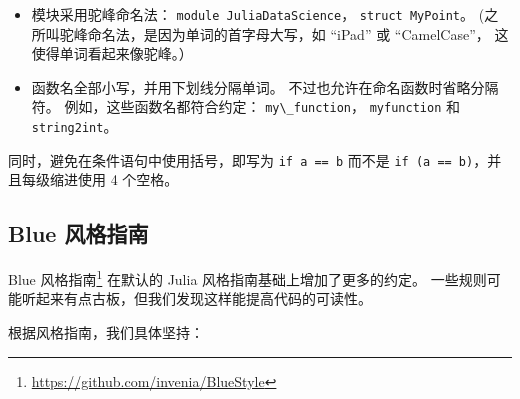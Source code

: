 \documentclass[
  notoc %
]{tufte-book}
\DeclareRobustCommand{\href}[2]{#2\footnote{\url{#1}}}
\providecommand{\tightlist}{%
  \setlength{\itemsep}{0pt}\setlength{\parskip}{0pt}
}
\newcommand{\passthrough}[1]{#1}
\begin{document}
\begin{itemize}
\tightlist
\item
  模块采用驼峰命名法：
  \passthrough{\lstinline!module JuliaDataScience!}，
  \passthrough{\lstinline!struct MyPoint!}。
  (之所叫驼峰命名法，是因为单词的首字母大写，如 ``iPad'' 或
  ``CamelCase''， 这使得单词看起来像驼峰。）
\item
  函数名全部小写，并用下划线分隔单词。
  不过也允许在命名函数时省略分隔符。 例如，这些函数名都符合约定：
  \passthrough{\lstinline!my\_function!}，
  \passthrough{\lstinline!myfunction!} 和
  \passthrough{\lstinline!string2int!}。
\end{itemize}

同时，避免在条件语句中使用括号，即写为
\passthrough{\lstinline!if a == b!} 而不是
\passthrough{\lstinline!if (a == b)!}，并且每级缩进使用 4 个空格。

\hypertarget{sec:blue_style_guide}{%
\subsection{Blue 风格指南}\label{sec:blue_style_guide}}

\href{https://github.com/invenia/BlueStyle}{Blue 风格指南} 在默认的
Julia 风格指南基础上增加了更多的约定。
一些规则可能听起来有点古板，但我们发现这样能提高代码的可读性。

根据风格指南，我们具体坚持：
\end{document}
